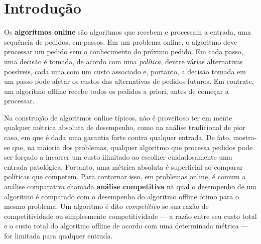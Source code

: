 \chapter{Introdução} 




Os \textbf{algoritmos online} são algoritmos que recebem e processam a entrada, uma sequência de pedidos, em passos. Em um problema online, o algoritmo deve processar um pedido sem o conhecimento do próximo pedido. Em cada passo, uma decisão é tomada, de acordo com uma \emph{política}, dentre várias alternativas possíveis, cada uma com um custo associado e, portanto, a decisão tomada em um passo pode afetar os custos das alternativas de pedidos futuros. Em contrate, um algoritmo offline recebe todos os pedidos a priori, antes de começar a processar. 

Na construção de algoritmos online típicos, não é proveitoso ter em mente qualquer métrica absoluta de desempenho, como na análise tradicional de pior caso, em que é dada uma garantia forte contra qualquer entrada. De fato, mostra-se que, na maioria dos problemas, qualquer algoritmo que processa pedidos pode ser forçado a incorrer um custo ilimitado ao escolher cuidadosamente uma entrada patológica. Portanto, uma métrica absoluta é superficial ao comparar políticas que competem. Para contornar isso, em problemas online, é comum a análise comparativa chamada \textbf{análise competitiva} na qual o desempenho de um algoritmo é comparado com o desempenho do algoritmo offline ótimo para o mesmo problema. Um algoritmo é dito \emph{competitivo} se sua razão de competitividade ou simplesmente competitividade — a razão entre seu custo total e o custo total do algoritmo offline de acordo com uma determinada métrica — for limitada para qualquer entrada.

